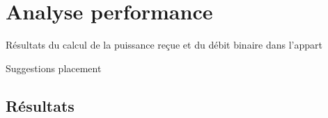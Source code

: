 \chapter{Analyse performance}
\label{chaper-4}

Résultats du calcul de la puissance reçue et du débit binaire dans l'appart

Suggestions placement


\section{Résultats}


